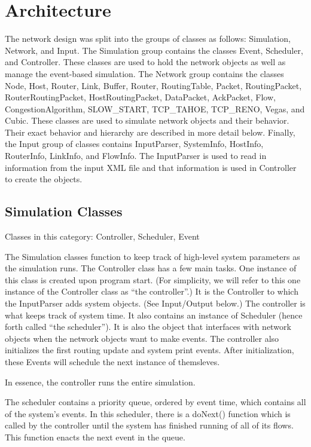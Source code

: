 

\section{Architecture}

    The network design was split into the groups of classes as follows: Simulation, Network, and Input. The Simulation group contains the classes Event, Scheduler, and Controller. These classes are used to hold the network objects as well as manage the event-based simulation. The Network group contains the classes Node, Host, Router, Link, Buffer, Router, RoutingTable, Packet, RoutingPacket, RouterRoutingPacket, HostRoutingPacket, DataPacket, AckPacket, Flow, CongestionAlgorithm, SLOW\_START, TCP\_TAHOE, TCP\_RENO, Vegas, and Cubic. These classes are used to simulate network objects and their behavior. Their exact behavior and hierarchy are described in more detail below. Finally, the Input group of classes contains InputParser, SystemInfo, HostInfo, RouterInfo, LinkInfo, and FlowInfo. The InputParser is used to read in information from the input XML file and that information is used in Controller to create the objects.

\subsection{Simulation Classes}
    Classes in this category: Controller, Scheduler, Event

    The Simulation classes function to keep track of high-level system parameters as the simulation runs. 
The Controller class has a few main tasks. One instance of this class is created upon program start. (For simplicity, we will refer to this one instance of the Controller class as “the controller”.) It is the Controller to which the InputParser adds system objects. (See Input/Output below.) The controller is what keeps track of system time. It also contains an instance of Scheduler (hence forth called “the scheduler”). It is also the object that interfaces with network objects when the network objects want to make events. The controller also initializes the first routing update and system print events. After initialization, these Events will schedule the next instance of themsleves.

 In essence, the controller runs the entire simulation.

The scheduler contains a priority queue, ordered by event time, which contains all of the system’s events. In this scheduler, there is a doNext() function which is called by the controller until the system has finished running of all of its flows. This function enacts the next event in the queue. 

